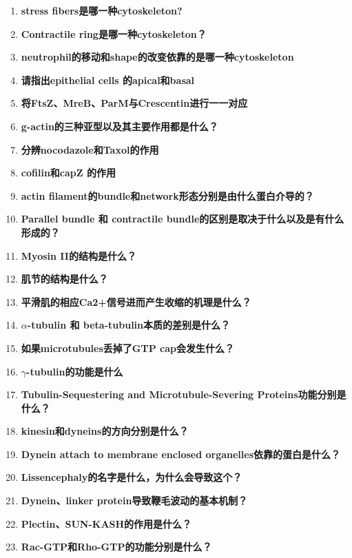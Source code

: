 \documentclass[12pt,fontset=none]{ctexart}
\begin{document}
\begin{enumerate}
\item \textbf{stress fibers是哪一种cytoskeleton?}

\item \textbf{Contractile ring是哪一种cytoskeleton？}

\item \textbf{neutrophil的移动和shape的改变依靠的是哪一种cytoskeleton}

\item \textbf{请指出epithelial cells 的apical和basal}

\item \textbf{将FtsZ、MreB、ParM与Crescentin进行一一对应}

\item \textbf{g-actin的三种亚型以及其主要作用都是什么？}

\item \textbf{分辨nocodazole和Taxol的作用}

\item \textbf{cofilin和capZ 的作用}

\item \textbf{actin filament的bundle和network形态分别是由什么蛋白介导的？}

\item \textbf{Parallel bundle 和 contractile bundle的区别是取决于什么以及是有什么形成的？}

\item \textbf{Myosin II的结构是什么？}

\item \textbf{肌节的结构是什么？}

\item \textbf{平滑肌的相应Ca2+信号进而产生收缩的机理是什么？}

\item \textbf{$\alpha$-tubulin 和 beta-tubulin本质的差别是什么？}

\item \textbf{如果microtubules丢掉了GTP cap会发生什么？}

\item \textbf{$\gamma$-tubulin的功能是什么}

\item \textbf{Tubulin-Sequestering and Microtubule-Severing Proteins功能分别是什么？}

\item \textbf{kinesin和dyneins的方向分别是什么？}

\item \textbf{Dynein attach to membrane enclosed organelles依靠的蛋白是什么？}

\item \textbf{Lissencephaly的名字是什么，为什么会导致这个？}

\item \textbf{Dynein、linker protein导致鞭毛波动的基本机制？}

\item \textbf{Plectin、SUN-KASH的作用是什么？}

\item \textbf{Rac-GTP和Rho-GTP的功能分别是什么？}

\end{enumerate}
\end{document}
